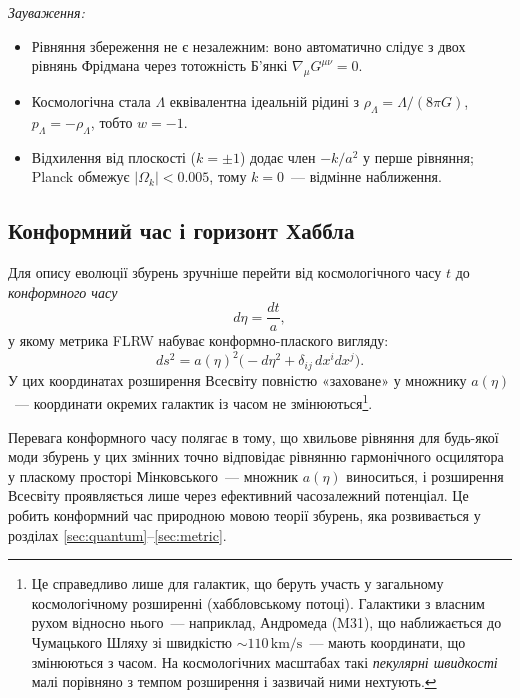 \documentclass[12pt, a4paper]{article}
\begin{document}
\noindent
\textit{Зауваження:}
\begin{itemize}
  \item Рівняння збереження не є незалежним: воно автоматично
        слідує з двох рівнянь Фрідмана через тотожність Б'янкі
        $\nabla_\mu G^{\mu\nu} = 0$.
  \item Космологічна стала $\Lambda$ еквівалентна ідеальній рідині
        з $\rho_\Lambda = \Lambda/(8\pi G)$, $p_\Lambda = -\rho_\Lambda$,
        тобто $w = -1$.
  \item Відхилення від плоскості ($k = \pm 1$) додає член
        $-k/a^2$ у перше рівняння; Planck обмежує
        $|\Omega_k| < 0.005$, тому $k = 0$~--- відмінне наближення.
\end{itemize}

\subsection*{Конформний час і горизонт Хаббла}

Для опису еволюції збурень зручніше перейти від
космологічного часу $t$ до \emph{конформного часу}
\begin{equation*}
  d\eta = \frac{dt}{a},
\end{equation*}
у якому метрика FLRW набуває конформно-плаского вигляду:
\begin{equation*}
  ds^2 = a(\eta)^2\bigl(-d\eta^2 + \delta_{ij}\,dx^i dx^j\bigr).
\end{equation*}
У цих координатах розширення Всесвіту повністю «заховане»
у множнику $a(\eta)$~--- координати окремих галактик із часом
не змінюються\footnote{Це справедливо лише для галактик,
що беруть участь у загальному космологічному розширенні
(хаббловському потоці). Галактики з власним рухом відносно
нього~--- наприклад, Андромеда (M31), що наближається до
Чумацького Шляху зі швидкістю ${\sim}110\,\mathrm{km/s}$~---
мають координати, що змінюються з часом. На космологічних
масштабах такі \emph{пекулярні швидкості} малі порівняно
з темпом розширення і зазвичай ними нехтують.}.

\begin{keybox}
Перевага конформного часу полягає в тому, що хвильове
рівняння для будь-якої моди збурень у цих змінних точно
відповідає рівнянню гармонічного осцилятора у пласкому
просторі Мінковського~--- множник $a(\eta)$ виноситься,
і розширення Всесвіту проявляється лише через ефективний
часозалежний потенціал. Це робить конформний час природною
мовою теорії збурень, яка розвивається у розділах
\ref{sec:quantum}–\ref{sec:metric}.
\end{keybox}
\end{document}
